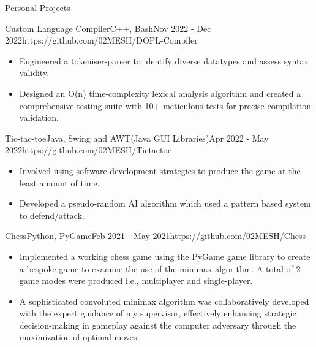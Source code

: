 \documentclass[11pt]{article}
\newlength{\secsep}
\newlength{\seperate}
\newcommand{\coloredhrulefill}[2][black]{%
    \leavevmode%
    \leaders\hbox{\textcolor{#1}{\rule{1ex}{0.5pt}}}\hfill\kern0pt%
}
\newcommand{\lineunder}{\vspace*{-8pt} \hspace*{-6pt} \coloredhrulefill[contactgrey]{}  \\* \vspace*{-8pt}}
\newenvironment{tabbedList}[1]{
	\begin{list}{}{
      \setlength{\itemsep}{0pt}
      \setlength{\labelsep}{0pt}
      \setlength{\labelwidth}{0pt}
      \setlength{\leftmargin}{0pt}
      \setlength{\rightmargin}{0pt}
      \setlength{\listparindent}{0pt}
      \setlength{\parsep}{0pt}
      \setlength{\parskip}{0pt}
      \setlength{\partopsep}{0pt}
      \setlength{\topsep}{#1}
	}
	\item[]
}{\end{list}}
\newenvironment{resume_section}[1] {
	\filbreak
	\vspace{1\secsep}
	\textsc{\Large\textcolor{darkblue}{#1}} \lineunder \vspace*{0.5\secsep}
	\begin{tabbedList}{\secsep}
}{\end{tabbedList}}
\newenvironment{personal_projects}[4] {
	\textbf{#1} \hfill \href{#4}{\color{darkblue}{\faGithub{\footnotesize \hspace*{\secsep}Project Link}}}\\*  %
	{\small Tech Stack: #2} \hfill {\footnotesize \textit{\color{contactgrey}{#3}}}\vspace*{1px}
	
	\begin{tabbedList}{0pt}
}{\end{tabbedList}\vspace*{0.8\secsep}}
\newenvironment{subitems}{
	\vspace*{-2px}
	\renewcommand{\labelitemi}{\color{contactgrey}{\faCode}}
	\begin{itemize}
		\setlength{\labelsep}{0.3em}
		\setlength{\itemsep}{0pt}
		\setlength{\parsep}{0pt}
		\setlength{\topsep}{0px}
}{\end{itemize}}
\begin{document}
\begin{resume_section}{Personal Projects}
		\begin{personal_projects} {Custom Language Compiler}{C++, Bash}{Nov 2022 - Dec 2022}{https://github.com/02MESH/DOPL-Compiler}
			\begin{subitems}
				\item{Engineered a tokeniser-parser to identify diverse datatypes and assess syntax validity.}
				\item{Designed an O(n) time-complexity lexical analysis algorithm and created a comprehensive testing suite with 10+ meticulous tests for precise compilation validation.}
			\end{subitems}
		\end{personal_projects}
		
		\vspace*{\seperate}	
	
		\begin{personal_projects} {Tic-tac-toe}{Java, Swing and AWT(Java GUI Libraries)}{Apr 2022 - May 2022}{https://github.com/02MESH/Tictactoe}
			\begin{subitems}
				\item{Involved using software development strategies to produce the game at the least amount of time.}
				\item{Developed a pseudo-random AI algorithm which used a pattern based system to defend/attack.}
			\end{subitems}
		\end{personal_projects}
		
		\vspace*{\seperate}	
	
		\begin{personal_projects} {Chess}{Python, PyGame}{Feb 2021 - May 2021}{https://github.com/02MESH/Chess}
			\begin{subitems}
				\item{Implemented a working chess game using the PyGame game library to create a bespoke game to examine the use of the minimax algorithm. A total of 2 game modes were produced i.e., multiplayer and single-player.}
				\item{A sophisticated convoluted minimax algorithm was collaboratively developed with the expert guidance of my supervisor, effectively enhancing strategic decision-making in gameplay against the computer adversary through the maximization of optimal moves.}
			\end{subitems}
		\end{personal_projects}
		
	\end{resume_section}
\end{document}
